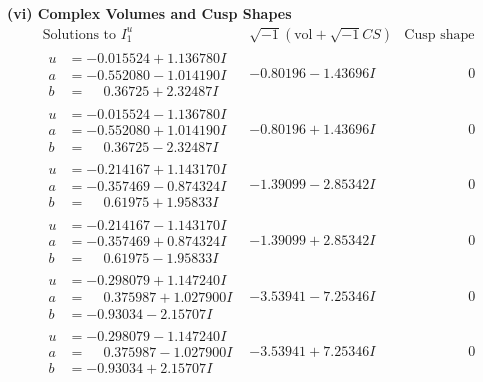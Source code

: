 \documentclass[1p]{elsarticle_modified}
\theoremstyle{definition}
\newcommand{\I}{\sqrt{-1}}
\begin{document}
\newpage\flushleft \textbf{(vi) Complex Volumes and Cusp Shapes}
$$\begin{array}{c|c|c}  
\text{Solutions to }I^u_{1}& \I (\text{vol} + \sqrt{-1}CS) & \text{Cusp shape}\\
 \hline 
\begin{aligned}
u &= -0.015524 + 1.136780 I \\
a &= -0.552080 - 1.014190 I \\
b &= \phantom{-}0.36725 + 2.32487 I\end{aligned}
 & -0.80196 - 1.43696 I & \phantom{-0.000000 } 0 \\ \hline\begin{aligned}
u &= -0.015524 - 1.136780 I \\
a &= -0.552080 + 1.014190 I \\
b &= \phantom{-}0.36725 - 2.32487 I\end{aligned}
 & -0.80196 + 1.43696 I & \phantom{-0.000000 } 0 \\ \hline\begin{aligned}
u &= -0.214167 + 1.143170 I \\
a &= -0.357469 - 0.874324 I \\
b &= \phantom{-}0.61975 + 1.95833 I\end{aligned}
 & -1.39099 - 2.85342 I & \phantom{-0.000000 } 0 \\ \hline\begin{aligned}
u &= -0.214167 - 1.143170 I \\
a &= -0.357469 + 0.874324 I \\
b &= \phantom{-}0.61975 - 1.95833 I\end{aligned}
 & -1.39099 + 2.85342 I & \phantom{-0.000000 } 0 \\ \hline\begin{aligned}
u &= -0.298079 + 1.147240 I \\
a &= \phantom{-}0.375987 + 1.027900 I \\
b &= -0.93034 - 2.15707 I\end{aligned}
 & -3.53941 - 7.25346 I & \phantom{-0.000000 } 0 \\ \hline\begin{aligned}
u &= -0.298079 - 1.147240 I \\
a &= \phantom{-}0.375987 - 1.027900 I \\
b &= -0.93034 + 2.15707 I\end{aligned}
 & -3.53941 + 7.25346 I & \phantom{-0.000000 } 0 \\ \hline\begin{aligned}

\end{aligned}
\end{array}$$
\end{document}
